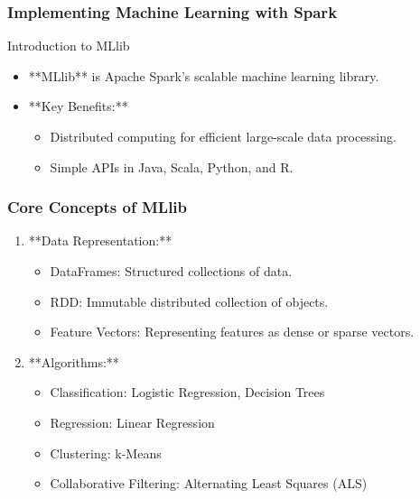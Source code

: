 \documentclass[aspectratio=169]{beamer}
\begin{document}
\begin{frame}[fragile]
    \frametitle{Implementing Machine Learning with Spark}
    \begin{block}{Introduction to MLlib}
        \begin{itemize}
            \item **MLlib** is Apache Spark's scalable machine learning library.
            \item **Key Benefits:**
                \begin{itemize}
                    \item Distributed computing for efficient large-scale data processing.
                    \item Simple APIs in Java, Scala, Python, and R.
                \end{itemize}
        \end{itemize}
    \end{block}
\end{frame}

\begin{frame}[fragile]
    \frametitle{Core Concepts of MLlib}
    \begin{enumerate}
        \item **Data Representation:**
            \begin{itemize}
                \item DataFrames: Structured collections of data.
                \item RDD: Immutable distributed collection of objects.
                \item Feature Vectors: Representing features as dense or sparse vectors.
            \end{itemize}
        \item **Algorithms:**
            \begin{itemize}
                \item Classification: Logistic Regression, Decision Trees
                \item Regression: Linear Regression
                \item Clustering: k-Means
                \item Collaborative Filtering: Alternating Least Squares (ALS)
            \end{itemize}
    \end{enumerate}
\end{frame}
\end{document}
